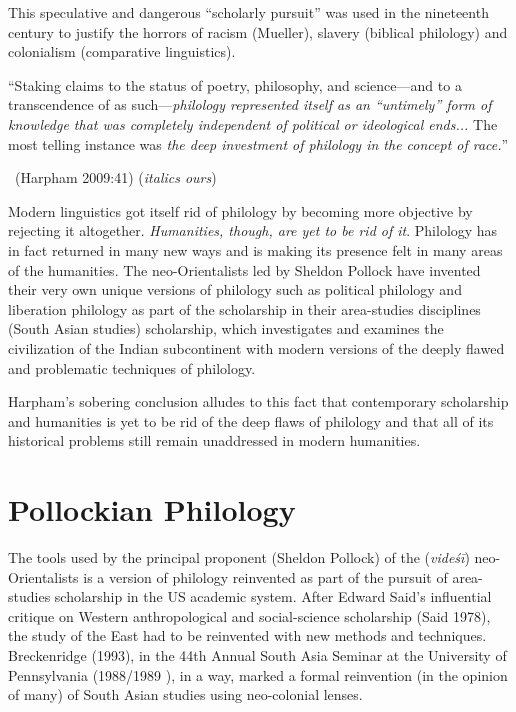 This speculative and dangerous “scholarly pursuit” was used in the nineteenth century to justify the horrors of racism (Mueller), slavery (biblical philology) and colonialism (comparative linguistics).

\begin{myquote}
“Staking claims to the status of poetry, philosophy, and science—and to a transcendence of as such—\textit{philology represented itself as an “untimely” form of knowledge that was completely independent of political or ideological ends...} The most telling instance was \textit{the deep investment of philology in the concept of race.}”

~\hfill (Harpham 2009:41) (\textit{italics ours})
\end{myquote}

Modern linguistics got itself rid of philology by becoming more objective by rejecting it altogether. \textit{Humanities, though, are yet to be rid of it}. Philology has in fact returned in many new ways and is making its presence felt in many areas of the humanities. The neo-Orientalists led by Sheldon Pollock have invented their very own unique versions of philology such as political philology and liberation philology as part of the scholarship in their area-studies disciplines (South Asian studies) scholarship, which investigates and examines the civilization of the Indian subcontinent with modern versions of the deeply flawed and problematic techniques of philology.

Harpham’s sobering conclusion alludes to this fact that contemporary scholarship and humanities is yet to be rid of the deep flaws of philology and that all of its historical problems still remain unaddressed in modern humanities.


\section*{Pollockian Philology}

The tools used by the principal proponent (Sheldon Pollock) of the (\textit{videśī}) neo-Orientalists is a version of philology reinvented as part of the pursuit of area-studies scholarship in the US academic system. After Edward Said’s influential critique on Western anthropological and social-science scholarship (Said 1978), the study of the East had to be reinvented with new methods and techniques. Breckenridge (1993), in the 44th Annual South Asia Seminar at the University of Pennsylvania (1988/1989 ), in a way, marked a formal reinvention (in the opinion of many) of South Asian studies using neo-colonial lenses.

